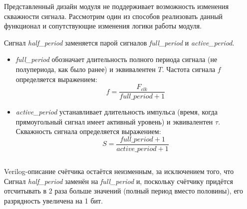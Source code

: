 Представленный дизайн модуля не поддерживает возможность изменения скважности сигнала. Рассмотрим один из способов реализовать данный функционал и сопутствующие изменения логики работы модуля.

Сигнал \textit{half\_period} заменяется парой сигналов \textit{full\_period} и \textit{active\_period}. 

\begin{itemize}
\item \textit{full\_period} обозначает длительность полного периода сигнала (не полупериода, как было ранее) и эквивалентен $T$. Частота сигнала $f$ определяется выражением:
$$ f = \frac{F_{clk}}{\textit{full\_period} + 1} $$ 
\item \textit{active\_period} устанавливает длительность импульса (время, когда прямоугольный сигнал имеет активный уровень) и эквивалентен $\tau$. Скважность сигнала определяется выражением:
$$ S = \frac{\textit{full\_period} + 1}{\textit{active\_period} + 1} $$
\end{itemize}


% 	

\begin{listing}[H]
	\inputminted[firstline=1, lastline=11]{SystemVerilog}{code_examples/lab_7/square_duty_cycle.sv}
\end{listing}


Verilog-описание счётчика остаётся неизменным, за исключением того, что Сигнал \textit{half\_period} заменён на \textit{full\_period} и, поскольку счётчику придётся отсчитывать в 2 раза больше значений (полный период вместо половины), его разрядность увеличена на 1 бит.

% 	

\begin{listing}[H]
	\inputminted[firstline=13, lastline=23]{SystemVerilog}{code_examples/lab_7/square_duty_cycle.sv}
\end{listing}

